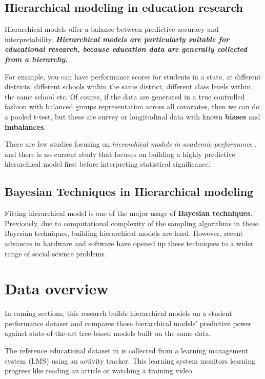 \documentclass{sigchi}
\begin{document}
\subsection{Hierarchical modeling in education research}
Hierarchical models offer a balance between 
predictive accuracy and interpretability. \textit{\textbf{Hierarchical models are particularly suitable for
educational research, because education data are generally collected
from a hierarchy.}} \cite{
skrondal2009prediction, kaplan2016causal} 

For example, you can have performance
scores for students in a
state, at different districts, different schools within the same district, different
class levels within the same school etc. Of course, if the data are generated in
a true controlled fashion with balanced groups representation across all
covariates, then we can do a pooled t-test, but these are survey or
longitudinal data with known \textbf{biases} and \textbf{imbalances}. \cite{konig2017bayesian}

There are few studies focusing on \textit{hierarchical models in academic performance}
\cite{tsai2015hierarchical, subedi2015measuring}, and there is no current study that focuses
on building a highly predictive hierarchical model first before interpreting
statistical significance.

\subsection{Bayesian Techniques in Hierarchical modeling}
Fitting hierarchical model is one of the
major usage of \textbf{Bayesian techniques}. Previously, due to
computational complexity of the sampling algorithms in these Bayesian techniques, building hierarchical models are hard.
However, recent advances in hardware and software have opened up these techniques to a wider range of social science problems. \cite{carpenter2017stan}

\section{Data overview}
In coming sections, this research builds hierarchical models on a student
performance dataset
and compares those hierarchical models' predictive power against
state-of-the-art tree-based models built on the same data.


The reference educational dataset in \cite{amrieh2016mining} is collected from a learning management system (LMS) using an activity tracker. This learning system monitors learning progress like reading an article or watching a training video. 
\end{document}
